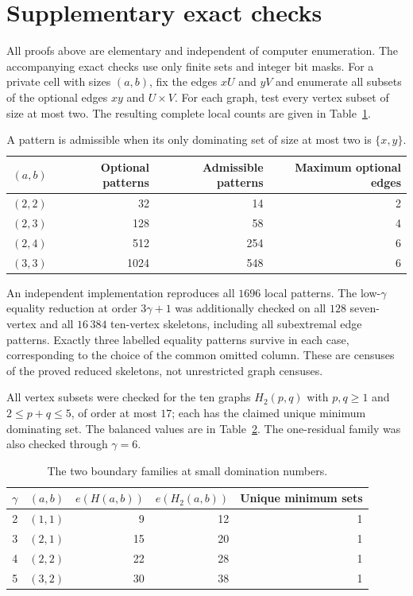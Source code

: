 \documentclass[11pt]{article}
\theoremstyle{definition}
\theoremstyle{remark}
\newcommand{\e}{e}
\begin{document}
\appendix
\section{Supplementary exact checks}\label{app:checks}

All proofs above are elementary and independent of computer enumeration.
The accompanying exact checks use only finite sets and integer bit masks.
For a private cell with sizes $(a,b)$, fix the edges $xU$ and $yV$ and
enumerate all subsets of the optional edges $xy$ and $U\times V$.
For each graph, test every vertex subset of size at most two.
The resulting complete local counts are given in Table~\ref{tab:cells}.

\begin{table}[htbp]
\centering
\begin{tabular}{rrrr}
\toprule
$(a,b)$ & Optional patterns & Admissible patterns & Maximum optional edges\\
\midrule
$(2,2)$ & 32 & 14 & 2\\
$(2,3)$ & 128 & 58 & 4\\
$(2,4)$ & 512 & 254 & 6\\
$(3,3)$ & 1024 & 548 & 6\\
\bottomrule
\end{tabular}
\caption{A pattern is admissible when its only dominating set of size at most two is $\{x,y\}$.}
\label{tab:cells}
\end{table}

An independent implementation reproduces all $1696$ local patterns.
The low-$\gamma$ equality reduction at order $3\gamma+1$ was additionally
checked on all $128$ seven-vertex and all $16\,384$ ten-vertex skeletons,
including all subextremal edge patterns. Exactly three labelled equality
patterns survive in each case, corresponding to the choice of the common
omitted column. These are censuses of the proved reduced skeletons, not
unrestricted graph censuses.

All vertex subsets were checked for the ten graphs $H_2(p,q)$ with
$p,q\ge1$ and $2\le p+q\le5$, of order at most $17$; each has the claimed
unique minimum dominating set. The balanced values are in
Table~\ref{tab:small}. The one-residual family was also checked through
$\gamma=6$.

\begin{table}[htbp]
\centering
\begin{tabular}{rrrrr}
\toprule
$\gamma$ & $(a,b)$ & $\e(H(a,b))$ & $\e(H_2(a,b))$ & Unique minimum sets\\
\midrule
2 & $(1,1)$ & 9 & 12 & 1\\
3 & $(2,1)$ & 15 & 20 & 1\\
4 & $(2,2)$ & 22 & 28 & 1\\
5 & $(3,2)$ & 30 & 38 & 1\\
\bottomrule
\end{tabular}
\caption{The two boundary families at small domination numbers.}
\label{tab:small}
\end{table}
\end{document}
